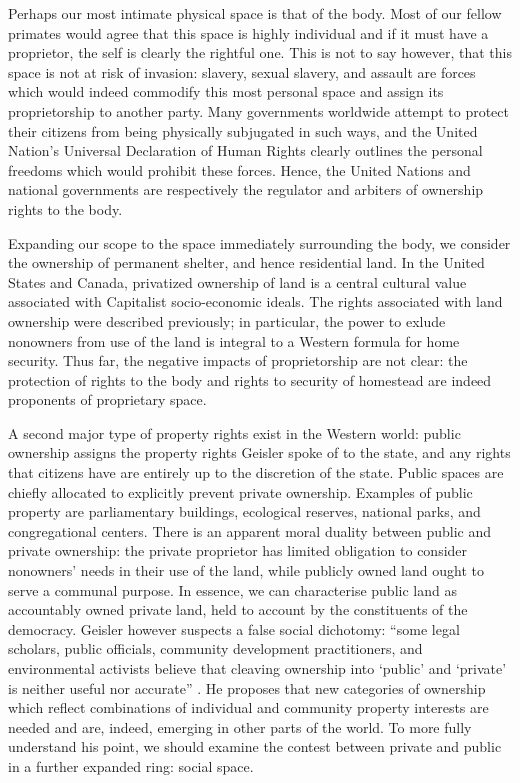 \documentclass[12pt, letterpaper, oneside]{article}
\begin{document}
Perhaps our most intimate physical space is that of the body. Most of our fellow primates would agree that this space is highly individual and if it must have a proprietor, the self is clearly the rightful one. This is not to say however, that this space is not at risk of invasion: slavery, sexual slavery, and assault are forces which would indeed commodify this most personal space and assign its proprietorship to another party. Many governments worldwide attempt to protect their citizens from being physically subjugated in such ways, and the United Nation's Universal Declaration of Human Rights clearly outlines the personal freedoms which would prohibit these forces. Hence, the United Nations and national governments are respectively the regulator and arbiters of ownership rights to the body.

Expanding our scope to the space immediately surrounding the body, we consider the ownership of permanent shelter, and hence residential land. In the United States and Canada, privatized ownership of land is a central cultural value associated with Capitalist socio-economic ideals. The rights associated with land ownership were described previously; in particular, the power to exlude nonowners from use of the land is integral to a Western formula for home security. Thus far, the negative impacts of proprietorship are not clear: the protection of rights to the body and rights to security of homestead are indeed proponents of proprietary space.

A second major type of property rights exist in the Western world: public ownership assigns the property rights Geisler spoke of to the state, and any rights that citizens have are entirely up to the discretion of the state. Public spaces are chiefly allocated to explicitly prevent private ownership. Examples of public property are parliamentary buildings, ecological reserves, national parks, and congregational centers. There is an apparent moral duality between public and private ownership: the private proprietor has limited obligation to consider nonowners' needs in their use of the land, while publicly owned land ought to serve a communal purpose. In essence, we can characterise public land as accountably owned private land, held to account by the constituents of the democracy. Geisler however suspects a false social dichotomy: ``some legal scholars, public officials, community development practitioners, and environmental activists believe that cleaving ownership into `public' and `private' is neither useful nor accurate'' \autocite{geisler2000property}. He proposes that new categories of ownership which reflect combinations of individual and community property interests are needed and are, indeed, emerging in other parts of the world. To more fully understand his point, we should examine the contest between private and public in a further expanded ring: social space.
\end{document}
